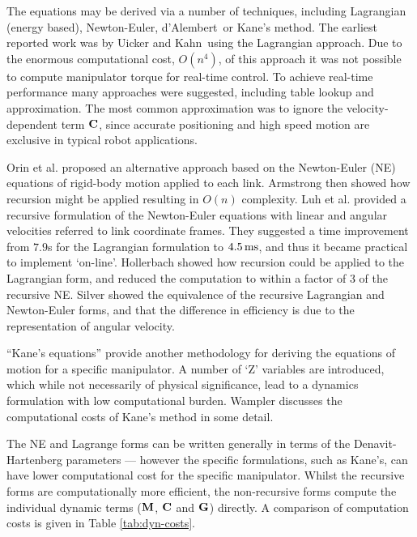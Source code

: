 \documentclass{article}
\newcommand{\etal}{{et al.}}
\newcommand{\unit}[1]{\mbox{$\rm \,#1$}}
\begin{document}
The equations may be derived via a number of techniques, including
Lagrangian (energy based), Newton-Euler,
d'Alembert\cite{Fu87,Lee83}\
or Kane's\cite{Kane83} method.
The earliest reported work was by Uicker\cite{Uicker65} and Kahn\cite{Kahn69}\
using the Lagrangian approach.
Due to the enormous computational cost, $O(n^4)$, of this approach it was not
possible to compute manipulator torque for real-time control.
To achieve real-time performance many approaches were suggested, including 
table lookup\cite{Raibert78} and
approximation\cite{Bejczy74,Paul72}.  
The most common
approximation
was to ignore the velocity-dependent term $\bf C$, since
accurate positioning and
high speed motion are exclusive in typical robot applications.

Orin \etal\cite{Orin79} proposed an alternative approach based
on the Newton-Euler (NE) equations of rigid-body motion applied to each link.
Armstrong\cite{Armstrong79} then showed how recursion might
be applied resulting in $O(n)$ complexity.
Luh \etal\cite{Luh80a} provided a recursive formulation of
the
Newton-Euler equations with linear and angular velocities referred to link
coordinate frames.  They suggested a time improvement from $7.9$s for the
Lagrangian formulation to $4.5\unit{ms}$, and thus it became practical to
implement `on-line'.
Hollerbach\cite{Hollerbach80} showed how recursion could be applied to
the Lagrangian form, and reduced the computation to within a factor of 3
of the recursive NE.  Silver\cite{Silver82} showed
the equivalence of the recursive Lagrangian and Newton-Euler forms, and
that the difference in efficiency is due to the representation of angular
velocity.

``Kane's equations'' \cite{Kane83} provide another methodology for
deriving the equations of motion for a specific manipulator.
A number of `Z' variables are introduced, which while not necessarily
of physical significance, lead to a dynamics formulation with low computational
burden.
Wampler\cite{Wampler85} discusses the computational costs of Kane's method
in some detail.

The NE and Lagrange forms can be written generally in terms of the
Denavit-Hartenberg parameters ---
however the specific formulations, such as Kane's, can have lower computational
cost for the specific manipulator.
Whilst the recursive forms are computationally more efficient, the
non-recursive forms compute the individual dynamic terms ($\bf M$, $\bf C$
and $\bf G$) directly.
A comparison of computation costs  is given in Table \ref{tab:dyn-costs}.
\end{document}
